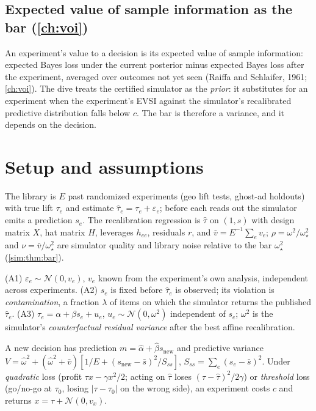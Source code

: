\subsection{Expected value of sample information as the bar (\cref{ch:voi})}

An experiment's value to a decision is its expected value of sample information: expected Bayes loss under the current posterior minus expected Bayes loss after the experiment, averaged over outcomes not yet seen (Raiffa and Schlaifer, 1961; \cref{ch:voi}). The dive treats the certified simulator as the \emph{prior}: it substitutes for an experiment when the experiment's EVSI against the simulator's recalibrated predictive distribution falls below $c$. The bar is therefore a variance, and it depends on the decision.

\section{Setup and assumptions}

The library is $E$ past randomized experiments (geo lift tests, ghost-ad holdouts) with true lift $\tau_e$ and estimate $\hat\tau_e = \tau_e + \varepsilon_e$; before each reads out the simulator emits a prediction $s_e$. The recalibration regression is $\hat\tau$ on $(1, s)$ with design matrix $X$, hat matrix $H$, leverages $h_{ee}$, residuals $r$, and $\bar v = E^{-1}\sum_e v_e$; $\rho = \omega^2/\omega_\star^2$ and $\nu = \bar v/\omega_\star^2$ are simulator quality and library noise relative to the bar $\omega_\star^2$ (\cref{sim:thm:bar}).

\begin{assumption}[A1--A3]
\label{sim:ass:model}
(A1) $\varepsilon_e \sim \mathcal N(0, v_e)$, $v_e$ known from the experiment's own analysis, independent across experiments. (A2) $s_e$ is fixed before $\hat\tau_e$ is observed; its violation is \emph{contamination}, a fraction $\lambda$ of items on which the simulator returns the published $\hat\tau_e$. (A3) $\tau_e = \alpha + \beta s_e + u_e$, $u_e \sim \mathcal N(0, \omega^2)$ independent of $s_e$; $\omega^2$ is the simulator's \emph{counterfactual residual variance} after the best affine recalibration.
\end{assumption}

\begin{definition}
\label{sim:def:decision}
A new decision has prediction $m = \hat\alpha + \hat\beta s_{\mathrm{new}}$ and predictive variance $V = \hat\omega^2 + (\hat\omega^2 + \bar v)[1/E + (s_{\mathrm{new}} - \bar s)^2/S_{ss}]$, $S_{ss} = \sum_e (s_e - \bar s)^2$. Under \emph{quadratic} loss (profit $\tau x - \gamma x^2/2$; acting on $\hat\tau$ loses $(\tau - \hat\tau)^2/2\gamma$) or \emph{threshold} loss (go/no-go at $\tau_0$, losing $|\tau - \tau_0|$ on the wrong side), an experiment costs $c$ and returns $x = \tau + \mathcal N(0, v_x)$.
\end{definition}

